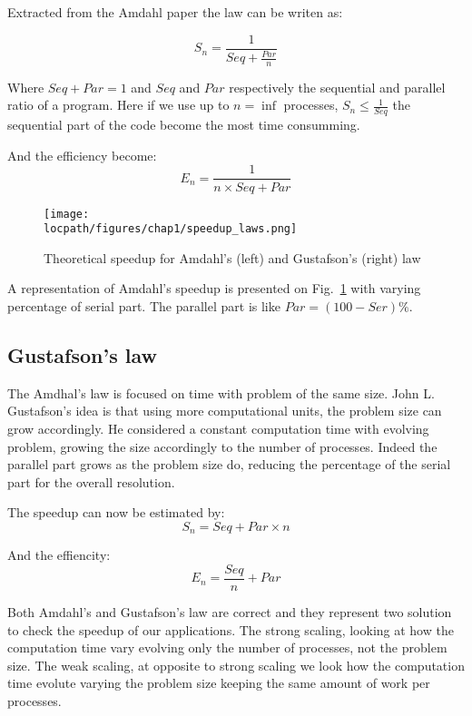 	Extracted from the Amdahl paper the law can be writen as: 

	\begin{equation}
	S_n = \frac{1}{Seq + \frac{Par}{n}}
	\end{equation}

	Where $Seq + Par = 1$ and $Seq$ and $Par$ respectively the sequential and parallel ratio of a program.
	Here if we use up to $n=\inf$ processes, $S_n \leq \frac{1}{Seq}$ the sequential part of the code become the most time consumming. 

	And the efficiency become:
	\begin{equation}
	E_n = \frac{1}{n\times Seq + Par}
	\end{equation}

	\begin{figure}
	\texttt{[image: \\locpath/figures/chap1/speedup\_laws.png]}
	\caption{Theoretical speedup for Amdahl's (left) and Gustafson's (right) law}
	\label{fig:1_HPC:speedup_laws}
	\end{figure}

	A representation of Amdahl's speedup is presented on Fig.~\ref{fig:1_HPC:speedup_laws} with varying percentage of serial part. 
	The parallel part is like $Par = (100-Ser)\%$.

	\subsection{Gustafson's law}
	The Amdhal's law is focused on time with problem of the same size. 
	John L. Gustafson's idea is that using more computational units, the problem size can grow accordingly. 
	He considered a constant computation time with evolving problem, growing the size accordingly to the number of processes. 
	Indeed the parallel part grows as the problem size do, reducing the percentage of the serial part for the overall resolution.

	The speedup can now be estimated by:
	\begin{equation}
	S_n = Seq + Par \times n
	\end{equation}

	And the effiencity: 
	\begin{equation}
	E_n = \frac{Seq}{n} + Par
	\end{equation}


	Both Amdahl's and Gustafson's law are correct and they represent two solution to check the speedup of our applications. 
	The strong scaling, looking at how the computation time vary evolving only the number of processes, not the problem size. 
	The weak scaling, at opposite to strong scaling we look how the computation time evolute varying the problem size keeping the same amount of work per processes. 

